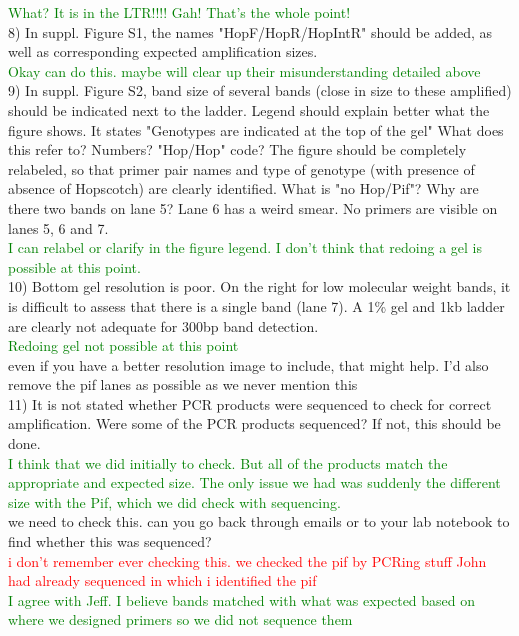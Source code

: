 \documentclass[11pt]{article}
\newcommand{\jri}[1]{\noindent \textcolor{red}{{#1}} \\}
\newcommand{\lev}[1]{\noindent \textcolor{green}{{#1}} \\}
\newcommand{\mbh}[1]{\noindent \textcolor{Dandelion}{{#1}}\\}
\begin{document}
\lev{What? It is in the LTR!!!! Gah! That's the whole point!}

8) In suppl. Figure S1, the names "HopF/HopR/HopIntR" should be added, as well as corresponding expected amplification sizes.\\

\lev{Okay can do this. maybe will clear up their misunderstanding detailed above}

9) In suppl. Figure S2, band size of several bands (close in size to these amplified) should be indicated next to the ladder. Legend should explain better what the figure shows. It states "Genotypes are indicated at the top of the gel" What does this refer to? Numbers? "Hop/Hop" code? The figure should be completely relabeled, so that primer pair names and type of genotype (with presence of absence of Hopscotch) are clearly identified. What is "no Hop/Pif"? Why are there two bands on lane 5? Lane 6 has a weird smear. No primers are visible on lanes 5, 6 and 7.\\

\lev{I can relabel or clarify in the figure legend. I don't think that redoing a gel is possible at this point.}

10) Bottom gel resolution is poor. On the right for low molecular weight bands, it is difficult to assess that there is a single band (lane 7). A 1\% gel and 1kb ladder are clearly not adequate for 300bp band detection.\\

\lev{Redoing gel not possible at this point}

\mbh{even if you have a better resolution image to include, that might help.  I'd also remove the pif lanes as possible as we never mention this}

11) It is not stated whether PCR products were sequenced to check for correct amplification. Were some of the PCR products sequenced? If not, this should be done.\\

\lev{I think that we did initially to check. But all of the products match the appropriate and expected size. The only issue we had was suddenly the different size with the Pif, which we did check with sequencing.}

\mbh{we need to check this.  can you go back through emails or to your lab notebook to find whether this was sequenced?}
\jri{i don't remember ever checking this. we checked the pif by PCRing stuff John had already sequenced in which i identified the pif}
\lev{I agree with Jeff. I believe bands matched with what was expected based on where we designed primers so we did not sequence them}
\end{document}
